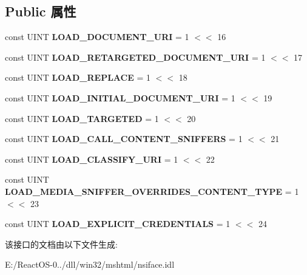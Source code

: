 \subsection*{Public 属性}
\begin{DoxyCompactItemize}
\item 
\mbox{\label{interfacens_i_channel_a894700d82815d27867ef19212b2639e9}} 
const U\+I\+NT {\bfseries L\+O\+A\+D\+\_\+\+D\+O\+C\+U\+M\+E\+N\+T\+\_\+\+U\+RI} = 1 $<$$<$ 16
\item 
\mbox{\label{interfacens_i_channel_ade5aba084623716cd452f56d7d539715}} 
const U\+I\+NT {\bfseries L\+O\+A\+D\+\_\+\+R\+E\+T\+A\+R\+G\+E\+T\+E\+D\+\_\+\+D\+O\+C\+U\+M\+E\+N\+T\+\_\+\+U\+RI} = 1 $<$$<$ 17
\item 
\mbox{\label{interfacens_i_channel_a614f81b95d16e116d173bc7ae74bc291}} 
const U\+I\+NT {\bfseries L\+O\+A\+D\+\_\+\+R\+E\+P\+L\+A\+CE} = 1 $<$$<$ 18
\item 
\mbox{\label{interfacens_i_channel_ac78ccd16c358361bd01ade9750066ee0}} 
const U\+I\+NT {\bfseries L\+O\+A\+D\+\_\+\+I\+N\+I\+T\+I\+A\+L\+\_\+\+D\+O\+C\+U\+M\+E\+N\+T\+\_\+\+U\+RI} = 1 $<$$<$ 19
\item 
\mbox{\label{interfacens_i_channel_a31fbc22a357005ac9cb0382e6d961945}} 
const U\+I\+NT {\bfseries L\+O\+A\+D\+\_\+\+T\+A\+R\+G\+E\+T\+ED} = 1 $<$$<$ 20
\item 
\mbox{\label{interfacens_i_channel_a5aca6b780cdc315e47b2f617413d8df3}} 
const U\+I\+NT {\bfseries L\+O\+A\+D\+\_\+\+C\+A\+L\+L\+\_\+\+C\+O\+N\+T\+E\+N\+T\+\_\+\+S\+N\+I\+F\+F\+E\+RS} = 1 $<$$<$ 21
\item 
\mbox{\label{interfacens_i_channel_aad9c4bf0fd1af5faa38b50e8a5fe274e}} 
const U\+I\+NT {\bfseries L\+O\+A\+D\+\_\+\+C\+L\+A\+S\+S\+I\+F\+Y\+\_\+\+U\+RI} = 1 $<$$<$ 22
\item 
\mbox{\label{interfacens_i_channel_a7a71dc38595ec1824e8694170e968868}} 
const U\+I\+NT {\bfseries L\+O\+A\+D\+\_\+\+M\+E\+D\+I\+A\+\_\+\+S\+N\+I\+F\+F\+E\+R\+\_\+\+O\+V\+E\+R\+R\+I\+D\+E\+S\+\_\+\+C\+O\+N\+T\+E\+N\+T\+\_\+\+T\+Y\+PE} = 1 $<$$<$ 23
\item 
\mbox{\label{interfacens_i_channel_aac4b7c80b94ee96e6e76949cee106b5c}} 
const U\+I\+NT {\bfseries L\+O\+A\+D\+\_\+\+E\+X\+P\+L\+I\+C\+I\+T\+\_\+\+C\+R\+E\+D\+E\+N\+T\+I\+A\+LS} = 1 $<$$<$ 24
\end{DoxyCompactItemize}


该接口的文档由以下文件生成\+:\begin{DoxyCompactItemize}
\item 
E\+:/\+React\+O\+S-\/0../dll/win32/mshtml/nsiface.\+idl\end{DoxyCompactItemize}
